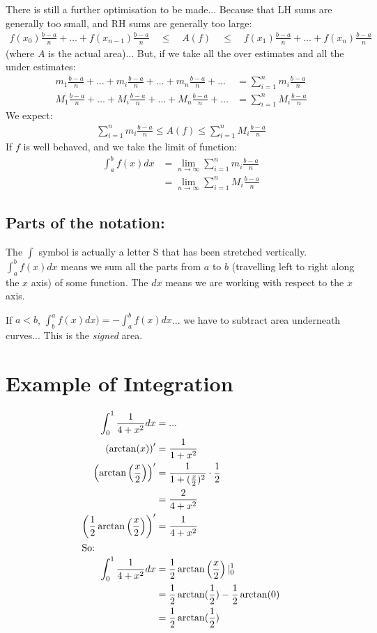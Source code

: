 \noindent There is still a further optimisation to be made... Because that LH
sums are generally too small, and RH sums are generally too large:
\begin{align}
  f(x_0) \frac{b-a}{n} + \ldots + f(x_{n-1})\frac{b-a}{n}
  \quad \leq \quad A(f) \quad \leq \quad
  f(x_1) \frac{b-a}{n} + \ldots + f(x_n) \frac{b-a}{n}
\end{align}
(where $A$ is the actual area)... But, if we take all the over estimates and all
the under estimates:
\begin{align}
  m_1 \frac{b-a}{n} + \ldots +
    m_i \frac{b-a}{n} + \ldots +
      m_n \frac{b-a}{n} + \ldots
      &= \sum_{i=1}^{n} m_i \frac{b-a}{n} \\
  M_1 \frac{b-a}{n} + \ldots +
    M_i \frac{b-a}{n} + \ldots +
      M_n \frac{b-a}{n} + \ldots
      &= \sum_{i=1}^{n} M_i \frac{b-a}{n}
\end{align}
We expect:
\begin{align}
  \sum_{i=1}^{n} m_i \frac{b-a}{n}
    \leq A(f) \leq
      \sum_{i=1}^{n} M_i \frac{b-a}{n}
\end{align}
If $f$ is well behaved, and we take the limit of function:
\begin{align}
  \int_a^b f(x) dx &= \lim_{n \to \infty} \sum_{i=1}^n m_i\frac{b-a}{n} \\
                   &= \lim_{n \to \infty} \sum_{i=1}^n M_i\frac{b-a}{n}
\end{align}

\subsection{Parts of the notation:}
The $\int$ symbol is actually a letter S that has been stretched vertically. \\
$\int_a^b f(x) dx$ means we sum all the parts from $a$ to $b$ (travelling left
to right along the $x$ axis) of some function. The $dx$ means we are working
with respect to the $x$ axis.

If $a<b$, $\int_b^a f(x) dx) = - \int_a^b f(x) dx$... we have to subtract area
underneath curves... This is the \emph{signed} area.


\section{Example of Integration}
\begin{align}
\int_{0}^{1} \frac{1}{4+x^2} dx
  &= ... \\
\left(\arctan(x)\right)' &= \frac{1}{1+x^2}  \\
\left(\arctan\left(\frac{x}{2}\right)\right)' &= \frac{1}{1+(\frac{x}{2})^2}\cdot\frac{1}{2} \\
  &= \frac{2}{4+x^2} \\
\left(\frac{1}{2}\arctan\left(\frac{x}{2}\right)\right)' &= \frac{1}{4+x^2} \\
\intertext{So:}
\int_{0}^{1} \frac{1}{4+x^2} dx
  &= \frac{1}{2}\arctan\left(\frac{x}{2}\right)|_0^1 \\
  &= \frac{1}{2}\arctan(\frac{1}{2}) - \frac{1}{2}\arctan(0) \\
  &= \frac{1}{2}\arctan(\frac{1}{2})
\end{align}

